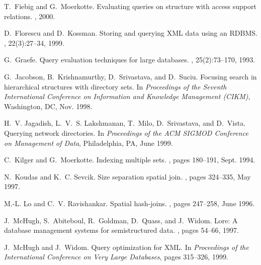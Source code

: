\documentclass[fleqn,11pt]{article}
\newcommand{\eat}[1]{}
\begin{document}
\begin{small}
{
T.~Fiebig and G.~Moerkotte.
\newblock Evaluating queries on structure with access support relations.
, 2000.

D.~Florescu and D.~Kossman.
\newblock Storing and querying {XML} data using an {RDBMS}.
, 22(3):27--34, 1999.

G.~Graefe.
\newblock Query evaluation techniques for large databases.
, 25(2):73--170, 1993.

G.~Jacobson, B.~Krishnamurthy, D.~Srivastava, and D.~Suciu.
\newblock Focusing search in hierarchical structures with directory sets.
\newblock In {\em Proceedings of the Seventh International Conference on
  Information and Knowledge Management (CIKM)}, Washington, DC, Nov. 1998.

H.~V. Jagadish, L.~V.~S. Lakshmanan, T.~Milo, D.~Srivastava, and D.~Vista.
\newblock Querying network directories.
\newblock In {\em Proceedings of the ACM SIGMOD Conference on Management of
  Data}, Philadelphia, PA, June 1999.

C.~Kilger and G.~Moerkotte.
\newblock Indexing multiple sets.
, pages 180--191, Sept. 1994.

N.~Koudas and K.~C. Sevcik.
\newblock Size separation spatial join.
, pages 324--335, May 1997.

M.-L. Lo and C.~V. Ravishankar.
\newblock Spatial hash-joins.
, pages 247--258, June 1996.

J.~McHugh, S.~Abiteboul, R.~Goldman, D.~Quass, and J.~Widom.
\newblock Lore: A database management systems for semistructured data.
, pages 54--66, 1997.


J.~McHugh and J.~Widom.
\newblock Query optimization for {XML}.
\newblock In {\em Proceedings of the International Conference on Very Large
  Databases}, pages 315--326, 1999.
}
\eat{
\bibitem{tukwila}
U.~of~Washington.
\newblock The {Tukwila} system.
\newblock Available from http://data.cs.washington.edu/integration/tukwila/.

\bibitem{niagara}
U.~of~Wisconsin.
\newblock The {Niagara} system.
\newblock Available from http://www.cs.wisc.edu/niagara/.

}
\end{small}
\end{document}
